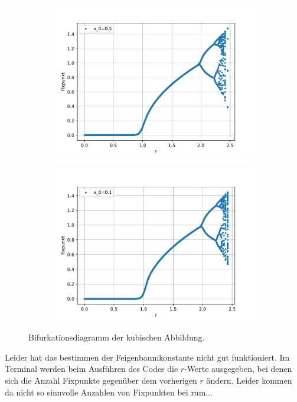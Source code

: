 \begin{itemize}
\begin{itemize}
        \begin{figure}
            \begin{subfigure}{.6\textwidth}
                \centering
                \includegraphics[width=.9\linewidth]{images/Bif_kub2.pdf}
            \end{subfigure}
            \begin{subfigure}{.6\textwidth}
                \centering
                \includegraphics[width=.9\linewidth]{images/Bif_kub0.pdf}
                \end{subfigure}
            \caption{Bifurkationsdiagramm der kubischen Abbildung. }

        \end{figure}
    \end{itemize}

    Leider hat das bestimmen der Feigenbaumkonstante nicht gut funktioniert. 
    Im Terminal werden beim Ausführen des Codes die $r$-Werte ausgegeben, bei denen sich die Anzahl Fixpunkte gegenüber dem vorherigen $r$ ändern.
    Leider kommen da nicht so sinnvolle Anzahlen von Fixpunkten bei rum... 

\end{itemize}



